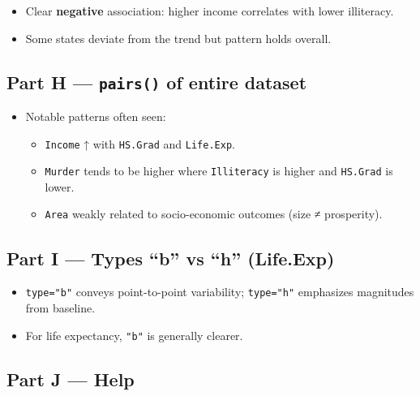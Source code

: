 \documentclass[
  letterpaper,
  DIV=11,
  numbers=noendperiod]{scrreprt}
\providecommand{\tightlist}{%
  \setlength{\itemsep}{0pt}\setlength{\parskip}{0pt}}
\begin{document}
\begin{itemize}
\tightlist
\item
  Clear \textbf{negative} association: higher income correlates with
  lower illiteracy.\\
\item
  Some states deviate from the trend but pattern holds overall.
\end{itemize}

\subsection{\texorpdfstring{Part H --- \texttt{pairs()} of entire
dataset}{Part H --- pairs() of entire dataset}}\label{part-h-pairs-of-entire-dataset}

\begin{itemize}
\tightlist
\item
  Notable patterns often seen:

  \begin{itemize}
  \tightlist
  \item
    \texttt{Income} ↑ with \texttt{HS.Grad} and \texttt{Life.Exp}.\\
  \item
    \texttt{Murder} tends to be higher where \texttt{Illiteracy} is
    higher and \texttt{HS.Grad} is lower.\\
  \item
    \texttt{Area} weakly related to socio-economic outcomes (size ≠
    prosperity).
  \end{itemize}
\end{itemize}

\subsection{Part I --- Types ``b'' vs ``h''
(Life.Exp)}\label{part-i-types-b-vs-h-life.exp}

\begin{itemize}
\tightlist
\item
  \texttt{type="b"} conveys point-to-point variability;
  \texttt{type="h"} emphasizes magnitudes from baseline.\\
\item
  For life expectancy, \texttt{"b"} is generally clearer.
\end{itemize}

\subsection{Part J --- Help}\label{part-j-help-1}
\end{document}

